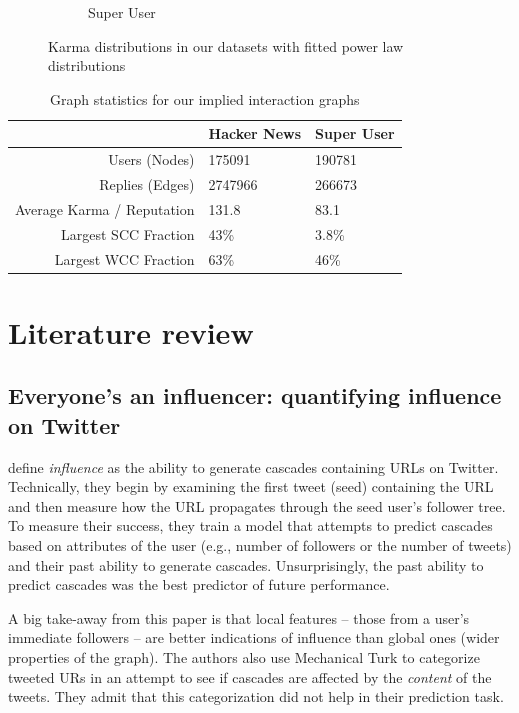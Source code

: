 \documentclass[10pt]{article}
\begin{document}
\begin{figure}[h]
\begin{subfigure}{0.49\textwidth}
\caption{Super User}
\label{fig:sukarma}
\end{subfigure}
\caption{Karma distributions in our datasets with fitted power law distributions}
\label{fig:karma}
\end{figure}

\begin{table}[h]
\begin{center}
\begin{tabular}{| r | l l |}
\hline
& \textbf{Hacker News} & \textbf{Super User} \\
\hline
Users (Nodes) & 175091 & 190781 \\
Replies (Edges) & 2747966 & 266673 \\
Average Karma / Reputation & 131.8 & 83.1 \\
Largest SCC Fraction & 43\% & 3.8\% \\
Largest WCC Fraction & 63\% & 46\% \\
\hline
\end{tabular}
\end{center}
\caption{Graph statistics for our implied interaction graphs}
\label{tab:graphstats}
\end{table}

\section{Literature review}
\subsection{Everyone's an influencer: quantifying influence on Twitter \citep{bakshy2011everyone}}

\citet{bakshy2011everyone} define \textit{influence} as the ability to generate
cascades containing URLs on Twitter. Technically, they begin by examining the
first tweet (seed) containing the URL and then measure how the URL propagates
through the seed user's follower tree. To measure their success, they train a
model that attempts to predict cascades based on attributes of the user (e.g.,
number of followers or the number of tweets) and their past ability to generate
cascades.  Unsurprisingly, the past ability to predict cascades was the best
predictor of future performance.

A big take-away from this paper is that local features -- those from a user's
immediate followers -- are better indications of influence than global ones
(wider properties of the graph). The authors also use Mechanical Turk to
categorize tweeted URs in an attempt to see if cascades are affected by the
\textit{content} of the tweets. They admit that this categorization did not help
in their prediction task. 
\end{document}
